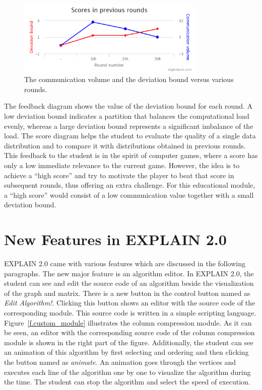 \documentclass[12pt, twoside,a4paper,toc=bibliography]{scrbook}
\begin{document}
\begin{figure}
\centering
\includegraphics[width=0.8\textwidth]{chart}
\caption{The communication volume and the deviation bound versus various rounds.}
\label{f.score}
\end{figure}
The feedback diagram shows the value of the deviation bound for each round.
A low deviation bound
indicates a partition that balances the computational load evenly, whereas a large
deviation bound represents a significant imbalance of the load. The score diagram helps the
student to evaluate the quality of a single data distribution and to compare it with
distributions obtained in previous rounds. This feedback to the student is in
the spirit of computer games, where a score has only a low immediate relevance to the
current game. However, the idea is to achieve a ``high score'' and try to motivate the
player to beat that score in subsequent rounds, thus offering an extra challenge. For
this educational module, a ``high score'' would consist of a low communication value
together with a small deviation bound.

\section{New Features in EXPLAIN 2.0}
\label{s.alg.edit}
EXPLAIN 2.0 came with various features which are
discussed in the following paragraphs. 
The new major feature is an algorithm editor.
In EXPLAIN 2.0, the student can see and edit the source code of an algorithm
beside the visualization of the graph and matrix.
There is a new button in the control button named as \textit{Edit Algorithm!}.
Clicking this button shows an editor with the source code of the corresponding module.
This source code is written in a simple scripting language.
Figure~\ref{f.custom_module} illustrates the column compression module.
As it can be seen, an editor with the corresponding source code of 
the column compression module is shown in the right part of the figure.
Additionally, the student can see an animation of this algorithm
by first selecting and ordering and then clicking the button 
named as \textit{animate}.
An animation goes through the vertices and executes each line of the algorithm
one by one to visualize the algorithm during the time.
The student can stop the algorithm and select the speed of execution.
\end{document}
